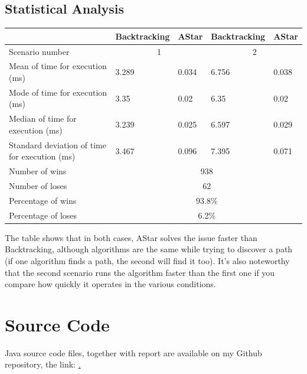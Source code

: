 \documentclass[a4paper,12pt]{article}
\begin{document}
\subsection{Statistical Analysis}
\begin{center}
\begin{tabular}{ |p{5cm}|p{2.5cm}|p{2.5cm}|p{2.5cm}|p{2.5cm}| }
    \hline
    & Backtracking&AStar&Backtracking&AStar\\
    \hline
    Scenario number&\multicolumn{2}{|c|}{1} & \multicolumn{2}{|c|}{2}\\
    \hline
    Mean of time for execution (ms) & 3.289 & 0.034 & 6.756 & 0.038\\
    Mode of time for execution (ms) & 3.35  & 0.02 &6.35& 0.02\\
    Median of time for execution (ms)& 3.239 & 0.025 &6.597& 0.029\\
    Standard deviation of time for execution (ms) & 3.467 & 0.096 &7.395& 0.071\\
    \hline
    Number of wins & \multicolumn{4}{|c|}{938} \\
    Number of loses & \multicolumn{4}{|c|}{62}  \\
    Percentage of wins & \multicolumn{4}{|c|}{93.8\%} \\
    Percentage of loses & \multicolumn{4}{|c|}{6.2\%} \\
    \hline
\end{tabular}
\end{center}
The table shows that in both cases, AStar solves the issue faster than Backtracking, although algorithms are the same while trying to discover a path (if one algorithm finds a path, the second will find it too). 
It's also noteworthy that the second scenario runs the algorithm faster than the first one if you compare how quickly it operates in the various conditions.
\section{Source Code}
Java source code files, together with report are available
on my Github repository, the link: \href{https://github.com/akmchnkv/Compass-and-Pirates}.\\
\end{document}
